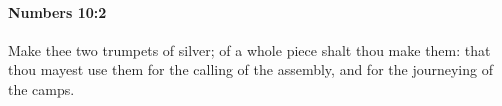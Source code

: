 
		\paragraph{Numbers 10:2} %
			\label{NUMBERS-10-2}

			Make thee two trumpets of silver; of a whole piece shalt thou make them: that thou mayest use them for the calling of the assembly, and for the journeying of the camps.



